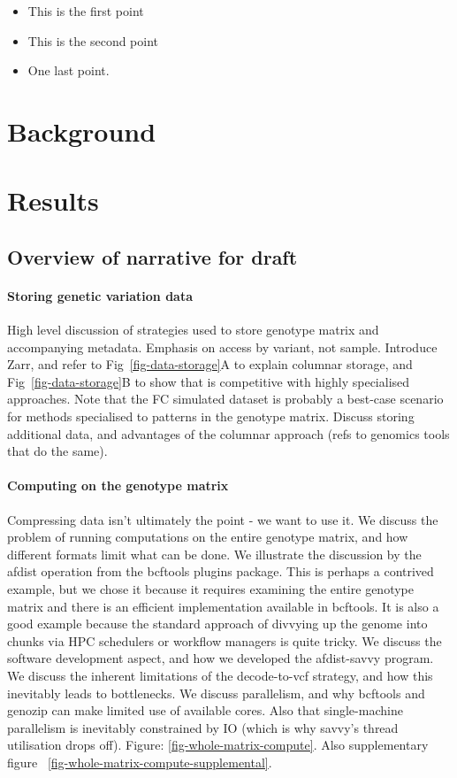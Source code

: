 \documentclass[a4paper,num-refs]{oup-contemporary}
\begin{document}
\begin{keypoints*}
\begin{itemize}
\item This is the first point
\item This is the second point
\item One last point.
\end{itemize}
\end{keypoints*}

\section{Background}

\section{Results}

\subsection{Overview of narrative for draft}

\paragraph{Storing genetic variation data}
High level discussion of
strategies used to store genotype matrix and accompanying metadata.
Emphasis on access by variant, not sample. Introduce Zarr, and
refer to Fig~\ref{fig-data-storage}A to explain columnar storage,
and Fig~\ref{fig-data-storage}B to show that is competitive
with highly specialised approaches.
Note that the FC simulated dataset is probably a best-case
scenario for methods specialised to patterns in the genotype matrix.
Discuss storing additional data, and advantages of the
columnar approach (refs to genomics tools that do the same).

\paragraph{Computing on the genotype matrix}
Compressing data isn't ultimately the point - we want to use it.
We discuss the problem of running computations on the entire
genotype matrix, and how different formats limit what can be done.
We illustrate the discussion by the afdist operation from
the bcftools plugins package. This is perhaps a contrived example, but
we chose it because it requires examining the entire genotype matrix
and there is an efficient implementation available in bcftools.
It is also a good example because the standard approach of
divvying up the genome into chunks via HPC schedulers or workflow
managers is quite tricky.
We discuss the software development aspect, and how we developed
the afdist-savvy program. We discuss the inherent limitations
of the decode-to-vcf strategy, and how this inevitably
leads to bottlenecks. We discuss parallelism, and why
bcftools and genozip can make limited use of available cores.
Also that single-machine parallelism is inevitably constrained
by IO (which is why savvy's thread utilisation drops off).
Figure: \ref{fig-whole-matrix-compute}. Also
supplementary figure ~\ref{fig-whole-matrix-compute-supplemental}.
\end{document}
